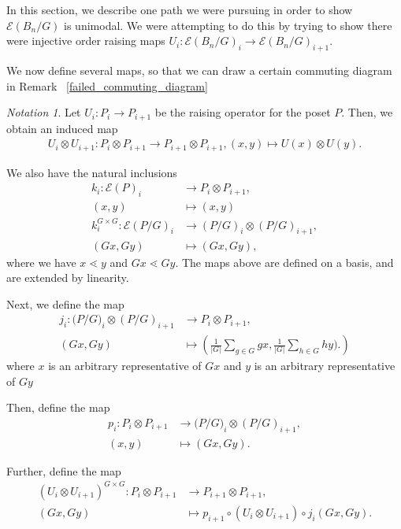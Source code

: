 \documentclass[10 pt]{amsart}
\theoremstyle{plain}
\theoremstyle{definition}
\theoremstyle{remark}
\newtheorem{note}[thm]{Notation}
\numberwithin{equation}{section}
\begin{document}
In this section, we describe one path we were pursuing in order to show $\mathcal E(B_n/G)$ is unimodal. We were attempting to do this by trying to show there were injective order raising maps $U_i:\mathcal E(B_n/G)_i \rightarrow \mathcal E(B_n/G)_{i+1}.$

We now define several maps, so that we can draw a certain commuting diagram in Remark ~\ref{failed_commuting_diagram}


\begin{note}
Let $U_i:P_i \rightarrow P_{i+1}$ be the raising operator for the poset $P.$ Then, we obtain an induced map
\begin{align*}
	U_i \otimes U_{i+1}:P_i\otimes P_{i+1} \rightarrow P_{i+1} \otimes P_{i+1},(x,y) \mapsto U(x) \otimes U(y).
\end{align*}

We also have the natural inclusions
\begin{align*}
	k_i:\mathcal E(P)_i &\rightarrow P_i \otimes P_{i+1},\\
	(x, y) &\mapsto (x, y)\\
	k_i^{G\times G}:\mathcal E(P/G)_i &\rightarrow (P/G)_i \otimes (P/G)_{i+1},\\
	(Gx, Gy) &\mapsto (Gx, Gy),
\end{align*}
where we have $x \lessdot y$ and $Gx \lessdot Gy.$ The maps above are defined on a basis, and are extended by linearity.

Next, we define the map
\begin{align*}
	j_i:\mathcal (P/G)_i \otimes (P/G)_{i+1} & \rightarrow P_i \otimes P_{i+1},\\
	(Gx, Gy) &\mapsto \left(\frac{1}{|G|}\sum_{g \in G}^{} gx, \frac{1}{|G|}\sum_{h\in G}^{}hy).\right)
\end{align*}
where $x$ is an arbitrary representative of $Gx$ and $y$ is an arbitrary representative of $Gy$

Then, define the map
\begin{align*}
	p_i: P_i \otimes P_{i+1} &\rightarrow \mathcal (P/G)_i \otimes (P/G)_{i+1},\\
	(x, y) &\mapsto (Gx, Gy).
\end{align*}

Further, define the map 
\begin{align*}
	(U_i \otimes U_{i+1})^{G\times G}:P_i\otimes P_{i+1} &\rightarrow P_{i+1} \otimes P_{i+1},\\
	(Gx, Gy) &\mapsto p_{i+1}\circ(U_i \otimes U_{i+1})\circ j_i(Gx, Gy).
\end{align*}


\end{note}
\end{document}
